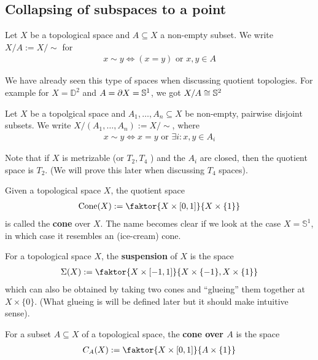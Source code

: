 \subsection{Collapsing of subspaces to a point}
\begin{dfn}[]
Let $X$ be a topological space and $A \subseteq X$ a non-empty subset.
We write $X/A := X/\sim$ for 
\begin{align*}
  x \sim y \iff (x = y) \text{ or } x,y \in A
\end{align*}
\end{dfn}
We have already seen this type of spaces when discussing quotient topologies.
For example for $X = \mathbb{D}^{2}$ and $A = \partial X = \mathbb{S}^{1}$, we got $X/A \cong \mathbb{S}^{2}$


\begin{dfn}[]
Let $X$ be a topolgical space and $A_{1}, \ldots, A_{n} \subseteq X$ be non-empty, pairwise disjoint subsets. 
We write $X/\left(
  A_{1}, \ldots, A_{n}
\right) := X/\sim$, where
\begin{align*}
  x \sim y \iff x = y \text{ or } \exists i: x,y \in A_i
\end{align*}
\end{dfn}
Note that if $X$ is metrizable (or $T_2,T_4$ ) and the $A_i$ are closed, then the quotient space is $T_2$. (We will prove this later when discussing $T_4$ spaces).

\begin{ex}
  Given a topological space $X$, the quotient space 
  \begin{align*}
    \text{Cone}(X) :=
    \faktor{X \times [0,1]}{X \times \{1\}}
  \end{align*}
  is called the \textbf{cone} over $X$.
  The name becomes clear if we look at the case $X = \mathbb{S}^{1}$, in which case it resembles an (ice-cream) cone.
\end{ex}

\begin{ex}[Suspension]
  For a topological space $X$, the \textbf{suspension} of $X$ is the space
  \begin{align*}
    \Sigma(X) := \faktor{X \times [-1,1]}{X \times \{-1\}, X \times \{1\}}
  \end{align*}
  which can also be obtained by taking two cones and ``glueing'' them together at $X \times \{0\}$. 
  (What glueing is will be defined later but it should make intuitive sense).
\end{ex}

\begin{ex}[]
For a subset $A \subseteq X$ of a topological space, the \textbf{cone over $A$} is the space
\begin{align*}
  C_A(X) := \faktor{X \times [0,1]}{A \times \{1\}}
\end{align*}
\end{ex}

